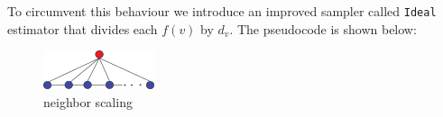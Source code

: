 To circumvent this behaviour we introduce an improved sampler called \texttt{Ideal} estimator that divides each $f(v)$ by $d_v$. The pseudocode is shown below:

\begin{figure}
  \begin{center}
    \includegraphics{fig1a}
    \caption{neighbor scaling}
    \label{fig:}
  \end{center}
\end{figure}
